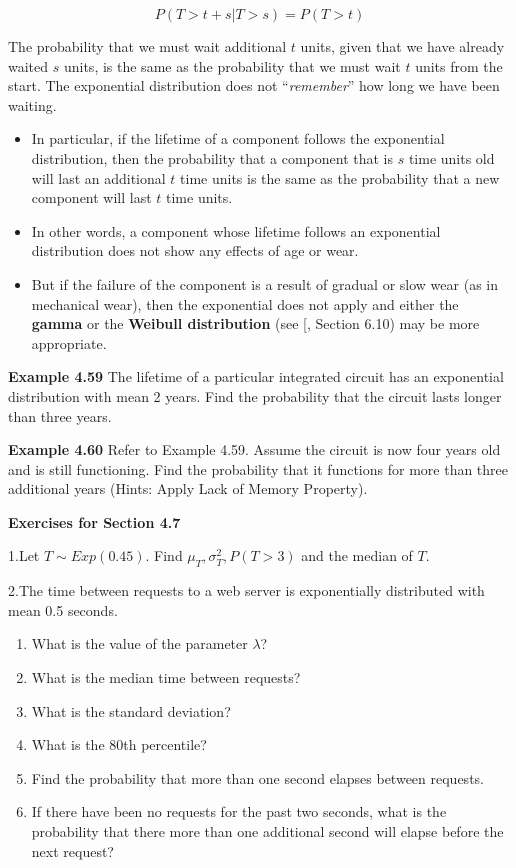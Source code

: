 \documentclass[
]{article}
\providecommand{\tightlist}{%
  \setlength{\itemsep}{0pt}\setlength{\parskip}{0pt}}
\begin{document}
\[P(T> t+s| T> s)=P(T> t)\]

The probability that we must wait additional \(t\) units, given that we have already waited \(s\) units, is the same as the probability that we must wait \(t\) units from the start. The exponential distribution does not ``\emph{remember}'' how long we have been waiting.

\begin{itemize}
\item
  In particular, if the lifetime of a component follows the exponential distribution, then the probability that a component that is \(s\) time units old will last an additional \(t\) time units is the same as the probability that a new component will last \(t\) time units.
\item
  In other words, a component whose lifetime follows an exponential distribution does not show any effects of age or wear\citep{navidi_statistics_2011}.
\item
  But if the failure of the component is a result of gradual or slow wear (as in mechanical wear), then the exponential does not apply and either the \textbf{gamma} or the \textbf{Weibull distribution} (see {[}\citet{walpole_probability_2017}, Section 6.10) may be more appropriate.
\end{itemize}

\textbf{Example 4.59}\citep{navidi_statistics_2011} The lifetime of a particular integrated circuit has an exponential distribution with mean 2 years. Find the probability that the circuit lasts longer than three years.

\textbf{Example 4.60}\citep{navidi_statistics_2011} Refer to Example 4.59. Assume the circuit is now four years old and is still functioning. Find the probability that it functions for more than three additional years (Hints: Apply Lack of Memory Property).

\textbf{Exercises for Section 4.7}\citep{navidi_statistics_2011}

1.Let \(T \sim Exp(0.45)\). Find \(\mu_T, \sigma^2_T, P(T>3)\) and the median of \(T\).

2.The time between requests to a web server is exponentially distributed with mean 0.5 seconds.

\begin{enumerate}
\def\labelenumi{\alph{enumi}.}
\tightlist
\item
  What is the value of the parameter \(\lambda\)?
\item
  What is the median time between requests?
\item
  What is the standard deviation?
\item
  What is the 80th percentile?
\item
  Find the probability that more than one second elapses between requests.
\item
  If there have been no requests for the past two seconds, what is the probability that there more than one additional second will elapse before the next request?
\end{enumerate}
\end{document}
